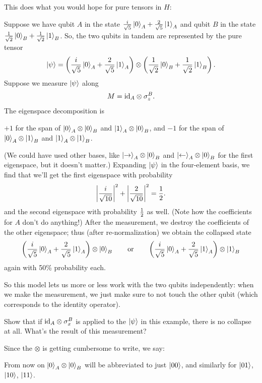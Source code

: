 This does what you would hope for pure tensors in $H$:
\begin{example}
	Suppose we have qubit $A$ in the state
	$\frac{i}{\sqrt5}\ket0_A + \frac{2}{\sqrt5}\ket1_A$
	and qubit $B$ in the state
	$\frac{1}{\sqrt2} \ket0_B + \frac{1}{\sqrt2}\ket1_B$.
	So, the two qubits in tandem are represented by the pure tensor
	\[
		\ket\psi
		=
		\left( \frac{i}{\sqrt5}\ket0_A + \frac{2}{\sqrt5}\ket1_A \right)
		\otimes
		\left( \frac{1}{\sqrt2} \ket0_B + \frac{1}{\sqrt2}\ket1_B \right).
	\]
	Suppose we measure $\ket\psi$ along
	\[ M = \mathrm{id}_A \otimes \sigma_z^B. \]
	The eigenspace decomposition is
	\begin{itemize}
		\ii $+1$ for the span of $\ket0_A \otimes \ket0_B$ and
		$\ket1_A \otimes \ket0_B$, and
		\ii $-1$ for the span of $\ket0_A \otimes \ket1_B$ and
		$\ket1_A \otimes \ket1_B$.
	\end{itemize}
	(We could have used other bases, like $\ket\rightarrow_A \otimes \ket0_B$ and
	$\ket\leftarrow_A \otimes \ket0_B$ for the first eigenspace, but it doesn't matter.)
	Expanding $\ket\psi$ in the four-element basis, we find that
	we'll get the first eigenspace with probability
	\[ \left|\frac{i}{\sqrt{10}}\right|^2
	+ \left|\frac{2}{\sqrt{10}}\right|^2 = \frac{1}{2}. \]
	and the second eigenspace with probability $\frac{1}{2}$ as well.
	(Note how the coefficients for $A$ don't do anything!)
	After the measurement, we destroy the coefficients of the other eigenspace;
	thus (after re-normalization) we obtain the collapsed state
	\[ \left( \frac{i}{\sqrt5}\ket0_A + \frac{2}{\sqrt5}\ket1_A \right)
		\otimes \ket0_B
		\qquad\text{or}\qquad
		\left( \frac{i}{\sqrt5}\ket0_A + \frac{2}{\sqrt5}\ket1_A \right)
		\otimes \ket1_B
	\]
	again with 50\% probability each.
\end{example}
So this model lets us more or less work with the two qubits independently:
when we make the measurement, we just make sure to not touch the other qubit
(which corresponds to the identity operator).

\begin{exercise}
	Show that if $\mathrm{id}_A \otimes \sigma_x^B$ is applied to the $\ket\psi$
	in this example, there is no collapse at all.
	What's the result of this measurement?
\end{exercise}

Since the $\otimes$ is getting cumbersome to write, we say:
\begin{abuse}
	From now on $\ket 0_A \otimes \ket 0_B$ will be abbreviated
	to just $\ket{00}$, and similarly for $\ket{01}$, $\ket{10}$, $\ket{11}$.
\end{abuse}

